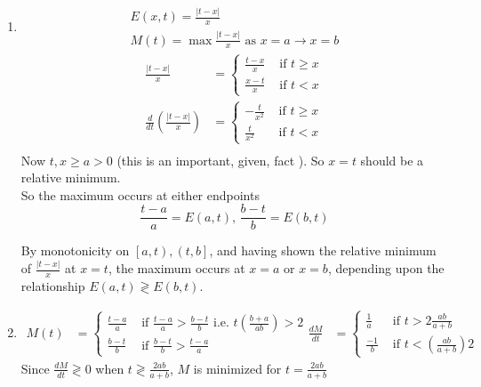 \documentclass[twoside]{amsart}
\theoremstyle{plain}
\theoremstyle{definition}
\newcommand{\exercisehead}[1]
  {\smallskip
   \noindent{\small\bf Exercise #1.}}
\begin{document}
\exercisehead{28} 
\begin{enumerate}
\item 
\[
\begin{gathered}
E(x,t) = \frac{ |t-x|}{x} \\
M(t) = \max{ \frac{ |t-x|}{ x} } \text{ as } x = a \to x = b
\end{gathered}
\]
\[
\begin{aligned}
  \frac{ |t-x|}{x} & = \begin{cases} 
    \frac{ t-x}{x} & \text{ if } t \geq x \\
    \frac{ x-t}{x} & \text{ if } t < x \end{cases} \\
  \frac{d}{dt} \left( \frac{ |t-x|}{x}  \right) & = \begin{cases} -\frac{t}{x^2} & \text{ if } t \geq x \\
    \frac{t}{x^2} & \text{ if } t < x 
  \end{cases} \\ 
\end{aligned}
\]
Now $t,x \geq a > 0$ (this is an important, given, fact ).  So $x=t$ should be a relative minimum.  \medskip \\
So the maximum occurs at either endpoints
\[
\frac{t-a}{a} = E(a,t), \, \frac{ b-t}{b} = E(b,t)
\]

By monotonicity on $\left[ a,t \right), \left(t,b \right] $, and having shown the relative minimum of $\frac{ |t-x| }{x}$ at $x=t$, the maximum occurs at $x=a$ or $x=b$, depending upon the relationship $E(a,t) \gtrless E(b,t)$.   
\item
\[
\begin{aligned}
M(t) & = \begin{cases} \frac{t-a}{a} & \text{ if } \frac{t-a}{a} > \frac{ b-t}{b} \text{ i.e. } t \left( \frac{b+a}{ab} \right) > 2 \\
  \frac{ b-t}{b} & \text{ if } \frac{ b-t}{b} > \frac{t-a}{a}  
\end{cases} 
\frac{dM}{dt} & = \begin{cases} \frac{1}{a} & \text{ if } t > 2 \frac{ ab}{a+b} \\
  \frac{-1}{b} & \text{ if } t < \left( \frac{ab}{a+b} \right) 2 
\end{cases} 
\end{aligned}
\]
Since $\frac{dM}{dt} \gtrless 0$ when $t \gtrless \frac{2ab}{a+b} $, $M$ is minimized for $\boxed{ t = \frac{2ab}{a+b} }$
\end{enumerate}
\end{document}

